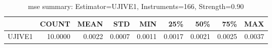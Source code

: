 \begin{table}[ht]
\centering
\caption{mse summary: Estimator=UJIVE1, Instruments=166, Strength=0.90}
\begin{tabular}{lrrrrrrrr}
\toprule
 & COUNT & MEAN & STD & MIN & 25\% & 50\% & 75\% & MAX \\
\midrule
UJIVE1 & 10.0000 & 0.0022 & 0.0007 & 0.0011 & 0.0017 & 0.0021 & 0.0025 & 0.0037 \\
\bottomrule
\end{tabular}
\end{table}

